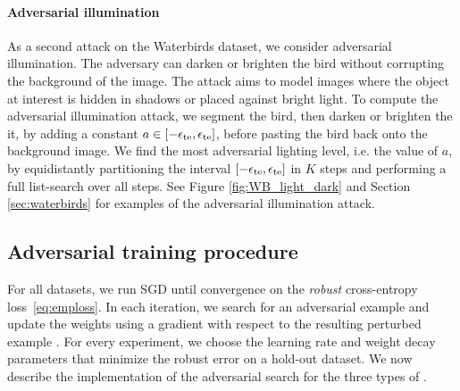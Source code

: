 \paragraph{Adversarial illumination} As a second attack on the Waterbirds dataset, we consider adversarial illumination. The adversary can darken or brighten the bird without corrupting the background of the image. The attack aims to model images where the object at interest is hidden in shadows or placed against bright light. 
To compute the adversarial illumination attack, we segment the bird, then darken or brighten the it, by adding a constant $a \in [-\epsilon_{\text{te}}, \epsilon_{\text{te}}]$, before pasting the bird back onto the background image. We find the most adversarial lighting level, i.e. the value of $a$, by equidistantly partitioning the interval $[-\epsilon_{\text{te}}, \epsilon_{\text{te}}]$ in $K$ steps and performing a full list-search over all steps.
See Figure \ref{fig:WB_light_dark} and Section \ref{sec:waterbirds} for examples of the adversarial illumination attack.


\subsection{Adversarial training procedure}

For all datasets, we run SGD until convergence on the \emph{robust} cross-entropy
loss~\eqref{eq:emploss}. In each iteration, we search for an adversarial example
and update the weights using a gradient with respect to the resulting
perturbed example \cite{goodfellow15, madry18}.
For every experiment, we choose the learning
rate and weight decay parameters that minimize the robust error on a
hold-out dataset. We now describe the implementation of the
adversarial search for the three types of
\nameofattacks. 

